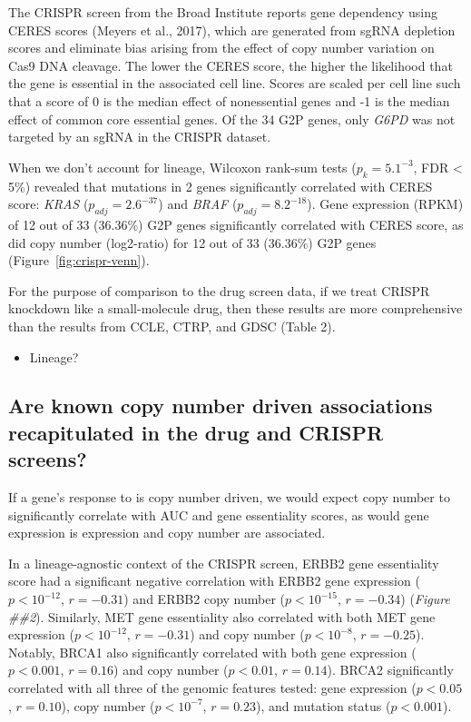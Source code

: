 \documentclass[man,floatsintext]{apa6}
\providecommand{\tightlist}{%
  \setlength{\itemsep}{0pt}\setlength{\parskip}{0pt}}
\begin{document}
The CRISPR screen from the Broad Institute reports gene dependency using
CERES scores (Meyers et al., 2017), which are generated from sgRNA
depletion scores and eliminate bias arising from the effect of copy
number variation on Cas9 DNA cleavage. The lower the CERES score, the
higher the likelihood that the gene is essential in the associated cell
line. Scores are scaled per cell line such that a score of 0 is the
median effect of nonessential genes and -1 is the median effect of
common core essential genes. Of the 34 G2P genes, only \emph{G6PD} was
not targeted by an sgRNA in the CRISPR dataset.

When we don't account for lineage, Wilcoxon rank-sum tests
(\(p_k = 5.1^{-3}\), FDR \textless{} 5\%) revealed that mutations in 2
genes significantly correlated with CERES score: \emph{KRAS}
(\(p_{adj} = 2.6^{-37}\)) and \emph{BRAF} (\(p_{adj} = 8.2^{-18}\)).
Gene expression (RPKM) of 12 out of 33 (36.36\%) G2P genes significantly
correlated with CERES score, as did copy number (log2-ratio) for 12 out
of 33 (36.36\%) G2P genes (Figure~\ref{fig:crispr-venn}).

For the purpose of comparison to the drug screen data, if we treat
CRISPR knockdown like a small-molecule drug, then these results are more
comprehensive than the results from CCLE, CTRP, and GDSC (Table 2).

\begin{itemize}
\tightlist
\item
  Lineage?
\end{itemize}

\subsection{Are known copy number driven associations recapitulated in
the drug and CRISPR
screens?}\label{are-known-copy-number-driven-associations-recapitulated-in-the-drug-and-crispr-screens}

If a gene's response to is copy number driven, we would expect copy
number to significantly correlate with AUC and gene essentiality scores,
as would gene expression is expression and copy number are associated.

In a lineage-agnostic context of the CRISPR screen, ERBB2 gene
essentiality score had a significant negative correlation with ERBB2
gene expression (\(p < 10^{-12}\), \(r = -0.31\)) and ERBB2 copy number
(\(p < 10^{-15}\), \(r = -0.34\)) (\emph{Figure \#\#2}). Similarly, MET
gene essentiality also correlated with both MET gene expression
(\(p < 10^{-12}\), \(r = -0.31\)) and copy number (\(p < 10^{-8}\),
\(r = -0.25\)). Notably, BRCA1 also significantly correlated with both
gene expression (\(p < 0.001\), \(r = 0.16\)) and copy number
(\(p < 0.01\), \(r = 0.14\)). BRCA2 significantly correlated with all
three of the genomic features tested: gene expression (\(p < 0.05\),
\(r = 0.10\)), copy number (\(p < 10^{-7}\), \(r = 0.23\)), and mutation
status (\(p < 0.001\)).
\end{document}
